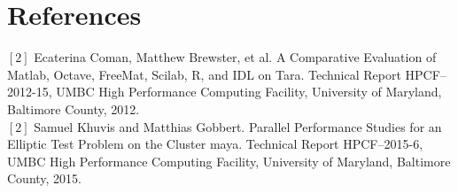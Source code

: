 \documentclass[11pt]{article}
\begin{document}
\section*{References}

$\left[2\right]$  Ecaterina Coman, Matthew Brewster, et al. A Comparative Evaluation of Matlab, Octave, FreeMat, Scilab, R, and IDL on Tara. Technical Report HPCF–2012-15, UMBC High Performance Computing Facility, University of Maryland, Baltimore County, 2012.\\
$\left[2\right]$  Samuel Khuvis and Matthias Gobbert. Parallel Performance Studies for an Elliptic Test Problem on the Cluster maya. Technical Report HPCF–2015-6, UMBC High Performance Computing Facility, University of Maryland, Baltimore County, 2015.
\end{document}
